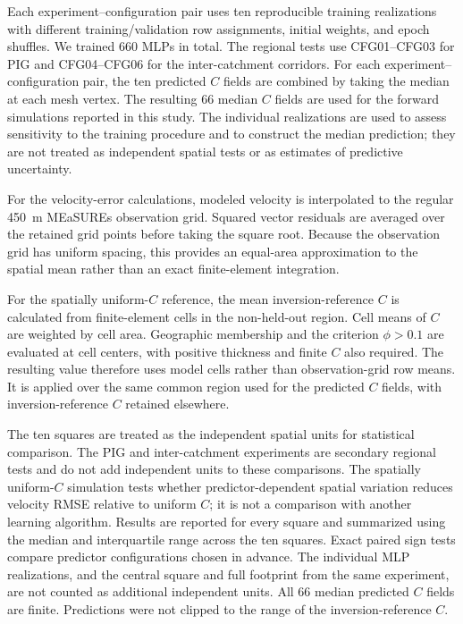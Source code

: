 \documentclass[review,jog]{igs}
\begin{document}
Each experiment--configuration pair uses ten reproducible training realizations with different training/validation row assignments, initial weights, and epoch shuffles. We trained 660 MLPs in total. The regional tests use CFG01--CFG03 for PIG and CFG04--CFG06 for the inter-catchment corridors. For each experiment--configuration pair, the ten predicted $C$ fields are combined by taking the median at each mesh vertex. The resulting 66 median $C$ fields are used for the forward simulations reported in this study. The individual realizations are used to assess sensitivity to the training procedure and to construct the median prediction; they are not treated as independent spatial tests or as estimates of predictive uncertainty.

For the velocity-error calculations, modeled velocity is interpolated to the
regular 450~m MEaSUREs observation grid. Squared vector residuals are averaged
over the retained grid points before taking the square root. Because the
observation grid has uniform spacing, this provides an equal-area approximation
to the spatial mean rather than an exact finite-element integration.

For the spatially uniform-$C$ reference, the mean inversion-reference $C$ is
calculated from finite-element cells in the non-held-out region. Cell means of
$C$ are weighted by cell area. Geographic membership and the criterion
$\phi>0.1$ are evaluated at cell centers, with positive thickness and finite
$C$ also required. The resulting value therefore uses model cells rather than
observation-grid row means. It is applied over the same common region used for
the predicted $C$ fields, with inversion-reference $C$ retained elsewhere.

The ten squares are treated as the independent spatial units for statistical comparison. The PIG and inter-catchment experiments are secondary regional tests and do not add independent units to these comparisons. The spatially uniform-$C$ simulation tests whether predictor-dependent spatial variation reduces velocity RMSE relative to uniform $C$; it is not a comparison with another learning algorithm. Results are reported for every square and summarized using the median and interquartile range across the ten squares. Exact paired sign tests compare predictor configurations chosen in advance. The individual MLP realizations, and the central square and full footprint from the same experiment, are not counted as additional independent units. All 66 median predicted $C$ fields are finite. Predictions were not clipped to the range of the inversion-reference $C$.
\end{document}
